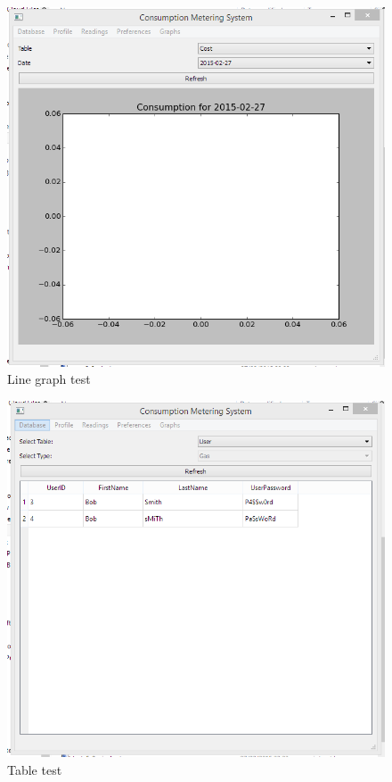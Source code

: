 \begin{figure}[H]
	\includegraphics{./testing/images/test_5_4_linegraph.png}
	\caption{Line graph test} \label{fig:test_5.4_results}
\end{figure}

\begin{figure}[H]
	\includegraphics{./testing/images/test_5_5_table.png}
	\caption{Table test} \label{fig:test_5.5_results}
\end{figure}

